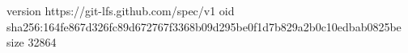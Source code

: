 version https://git-lfs.github.com/spec/v1
oid sha256:164fe867d326fc89d672767f3368b09d295be0f1d7b829a2b0c10edbab0825be
size 32864
